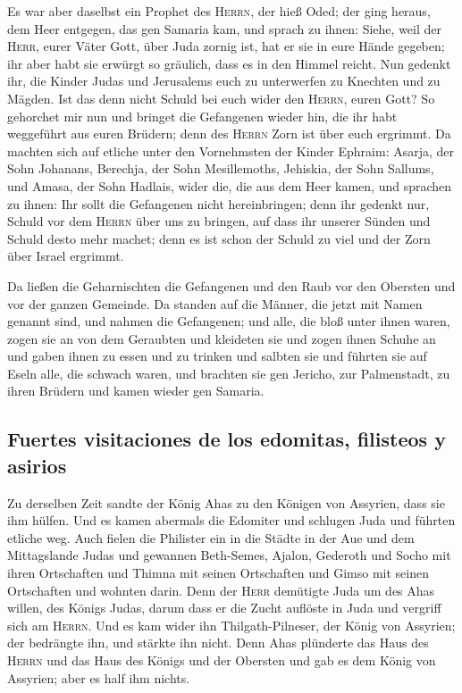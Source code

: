  Es war aber daselbst ein Prophet des \textsc{Herrn}, der
hieß Oded; der ging heraus, dem Heer entgegen, das gen Samaria kam, und
sprach zu ihnen: Siehe, weil der \textsc{Herr}, eurer Väter Gott, über
Juda zornig ist, hat er sie in eure Hände gegeben; ihr aber habt sie
erwürgt so gräulich, dass es in den Himmel reicht.  Nun
gedenkt ihr, die Kinder Judas und Jerusalems euch zu unterwerfen zu
Knechten und zu Mägden. Ist das denn nicht Schuld bei euch wider den
\textsc{Herrn}, euren Gott?  So gehorchet mir nun und
bringet die Gefangenen wieder hin, die ihr habt weggeführt aus euren
Brüdern; denn des \textsc{Herrn} Zorn ist über euch ergrimmt.
 Da machten sich auf etliche unter den Vornehmsten der
Kinder Ephraim: Asarja, der Sohn Johanans, Berechja, der Sohn
Mesillemoths, Jehiskia, der Sohn Sallums, und Amasa, der Sohn Hadlais,
wider die, die aus dem Heer kamen,  und sprachen zu
ihnen: Ihr sollt die Gefangenen nicht hereinbringen; denn ihr gedenkt
nur, Schuld vor dem \textsc{Herrn} über uns zu bringen, auf dass ihr
unserer Sünden und Schuld desto mehr machet; denn es ist schon der
Schuld zu viel und der Zorn über Israel ergrimmt.

 Da ließen die Geharnischten die Gefangenen und den Raub
vor den Obersten und vor der ganzen Gemeinde.  Da standen
auf die Männer, die jetzt mit Namen genannt sind, und nahmen die
Gefangenen; und alle, die bloß unter ihnen waren, zogen sie an von dem
Geraubten und kleideten sie und zogen ihnen Schuhe an und gaben ihnen zu
essen und zu trinken und salbten sie und führten sie auf Eseln alle, die
schwach waren, und brachten sie gen Jericho, zur Palmenstadt, zu ihren
Brüdern und kamen wieder gen Samaria.

\hypertarget{fuertes-visitaciones-de-los-edomitas-filisteos-y-asirios}{%
\subsection{Fuertes visitaciones de los edomitas, filisteos y
asirios}\label{fuertes-visitaciones-de-los-edomitas-filisteos-y-asirios}}

 Zu derselben Zeit sandte der König Ahas zu den Königen
von Assyrien, dass sie ihm hülfen.  Und es kamen abermals
die Edomiter und schlugen Juda und führten etliche weg. 
Auch fielen die Philister ein in die Städte in der Aue und dem
Mittagslande Judas und gewannen Beth-Semes, Ajalon, Gederoth und Socho
mit ihren Ortschaften und Thimna mit seinen Ortschaften und Gimso mit
seinen Ortschaften und wohnten darin.  Denn der
\textsc{Herr} demütigte Juda um des Ahas willen, des Königs Judas, darum
dass er die Zucht auflöste in Juda und vergriff sich am \textsc{Herrn}.
 Und es kam wider ihn Thilgath-Pilneser, der König von
Assyrien; der bedrängte ihn, und stärkte ihn nicht.  Denn
Ahas plünderte das Haus des \textsc{Herrn} und das Haus des Königs und
der Obersten und gab es dem König von Assyrien; aber es half ihm nichts.

